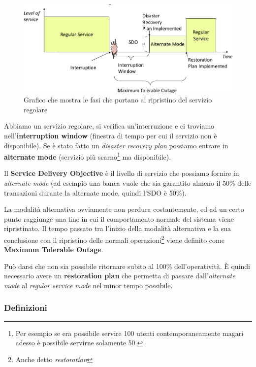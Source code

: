 \begin{figure}[h!]
	\begin{center}
		\includegraphics[scale=0.65]{res/img/recovery-times.png}
	\end{center}
	\caption{Grafico che mostra le fasi che portano al ripristino del servizio regolare} %
\end{figure}

Abbiamo un servizio regolare, si verifica un'interruzione e ci troviamo 
nell'\textbf{interruption window} (finestra di tempo per cui il servizio non è 
disponibile). Se è stato fatto un \textit{disaster recovery plan}
possiamo entrare in \textbf{alternate mode} (servizio più scarno\footnote{Per 
esempio se era possibile servire 100 utenti contemporaneamente magari adesso 
\`e possibile servirne solamente 50.} ma disponibile).

Il \textbf{Service Delivery Objective} è il livello di servizio che possiamo 
fornire in \textit{alternate mode} (ad esempio una banca vuole che sia 
garantito almeno il 50\% delle transazioni durante la alternate mode, quindi 
l'SDO è 50\%).

La modalità alternativa ovviamente non perdura costantemente, ed ad un certo 
punto raggiunge una fine in cui il comportamento normale del sistema viene 
ripristinato. Il tempo passato tra l'inizio della modalità alternativa e la 
sua conclusione con il ripristino delle normali operazioni\footnote{Anche 
detto \textit{restoration}} viene definito come \textbf{Maximum Tolerable 
Outage}.

Può darsi che non sia possibile ritornare subito al 100\% dell'operatività. 
È quindi necessario avere un \textbf{restoration plan} che permetta di passare 
dall'\textit{alternate mode} al \textit{regular service mode} nel minor tempo 
possibile.

\subsubsection{Definizioni}

